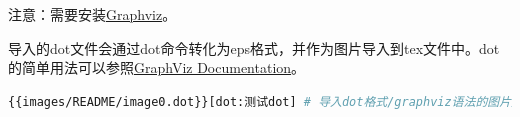 \documentclass[export, 12pt, letterpaper]{ctexrep}
\newenvironment{shadedquotation}
 {\begin{shaded*}
  \quoting[leftmargin=5pt, rightmargin=5pt, vskip=0pt]
 }
 {\endquoting
 \end{shaded*}
}
\begin{document}
\begin{shadedquotation}
\noindent
注意：需要安装\href{https://graphviz.org/download/}{Graphviz}。
\end{shadedquotation}


导入的dot文件会通过dot命令转化为eps格式，并作为图片导入到tex文件中。dot的简单用法可以参照\href{https://graphviz.org/documentation/}{GraphViz Documentation}。

\begin{lstlisting}[language=Bash]
{{images/README/image0.dot}}[dot:测试dot] # 导入dot格式/graphviz语法的图片文件，并用“测试dot”作为标题。
\end{lstlisting}

\end{document}

